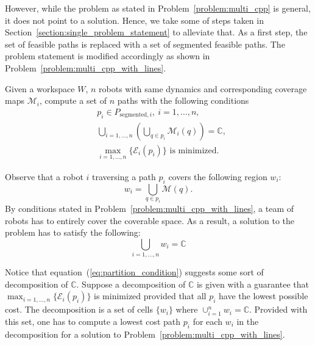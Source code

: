 \documentclass[../main.tex]{subfiles}
\begin{document}
However, while the problem as stated in Problem~\ref{problem:multi_cpp} is general, it does not point to a solution. Hence, we take some of steps taken in Section~\ref{section:single_problem_statement} to alleviate that. As a first step, the set of feasible paths is replaced with a set of segmented feasible paths. The problem statement is modified accordingly as shown in Problem~\ref{problem:multi_cpp_with_lines}.
\begin{problem}
\label{problem:multi_cpp_with_lines}
	Given a workspace $W$, $n$ robots with same dynamics and corresponding coverage maps $\mathcal{M}_i$, compute a set of $n$ paths with the following conditions
	\begin{equation}
	\begin{aligned}
		& p_i\in P_{\text{segmented},i},\ i=1,\dots,n,\\
		& \bigcup_{i=1,\dots,n}(\bigcup_{q\in p_i}\mathcal{M}_i(q))=\mathbb{C},\\
		& \max_{i=1,\ldots,n}\{\mathcal{E}_i(p_i)\}\text{ is minimized.}
	\end{aligned}
	\end{equation}
\end{problem}

Observe that a robot $i$ traversing a path $p_i$ covers the following region $w_i$:
\begin{equation}
	w_i=\bigcup_{q\in p_i}\mathcal{M}(q).
\end{equation}
By conditions stated in Problem~\ref{problem:multi_cpp_with_lines}, a team of robots has to entirely cover the coverable space. As a result, a solution to the problem has to satisfy the following:
\begin{equation}
	\label{eq:partition_condition}
	\bigcup_{i=1,\ldots,n}w_i=\mathbb{C}
\end{equation}

Notice that equation~(\ref{eq:partition_condition}) suggests some sort of decomposition of $\mathbb{C}$. Suppose a decomposition of $\mathbb{C}$ is given with a guarantee that $\max_{i=1,\ldots,n}\{\mathcal{E}_i(p_i)\}$ is minimized provided that all $p_i$ have the lowest possible cost. The decomposition is a set of cells $\{w_i\}$ where $\cup_{i=1}^nw_i=\mathbb{C}$. Provided with this set, one has to compute a lowest cost path $p_i$ for each $w_i$ in the decomposition for a solution to Problem~\ref{problem:multi_cpp_with_lines}.
\end{document}
